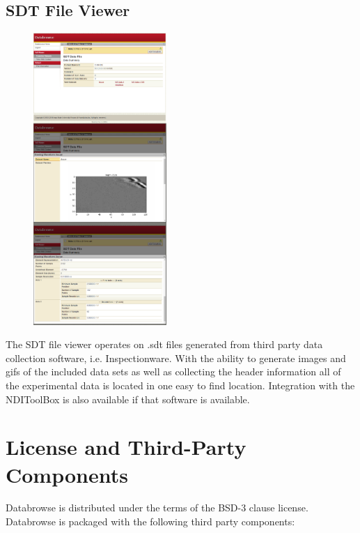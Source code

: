 \documentclass[10pt]{article}
\begin{document}
\endgroup


\begingroup
\setlength\intextsep{0pt}
\subsection{SDT File Viewer}
\begin{figure}
		\includegraphics[width=0.45\textwidth]{SDT_Viewer.png}
\end{figure}
The SDT file viewer operates on .sdt files generated from third party data collection software, i.e. Inspectionware. With the ability to generate images and gifs of the included data sets as well as collecting the header information all of the experimental data is located in one easy to find location. Integration with the NDIToolBox is also available if that software is available.

\endgroup

\clearpage
\section{License and Third-Party Components}
Databrowse is distributed under the terms of the BSD-3 clause license. \\

\noindent Databrowse is packaged with the following third party components: \\
\end{document}

